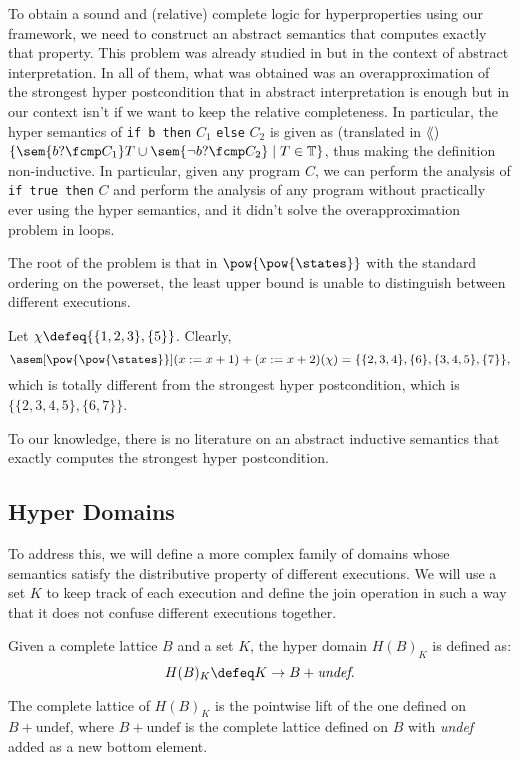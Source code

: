 To obtain a sound and (relative) complete logic for hyperproperties using
our framework, we need to construct an abstract semantics that computes
exactly that property. This problem was already studied in \cite{Mounir17,
Mastroeni18} but in the context of abstract interpretation. In all of them,
what was obtained was an overapproximation of the strongest hyper postcondition
that in abstract interpretation is enough but in our context isn't if we want
to keep the relative completeness. In particular,
the hyper semantics of \texttt{if b then} $C_1$ \texttt{else} $C_2$ is given
as (translated in $\lang$) $\{ \sem{b ? \fcmp C_1} T \cup 
\sem{\neg b ? \fcmp C_2} \mid T \in \mathbb{T}\}$, thus making the definition
non-inductive. In particular, given any program $C$, we can perform the analysis
of \texttt{if true then} $C$ and perform the analysis of any program without 
practically ever using the hyper semantics, and it didn't solve the 
overapproximation problem in loops.

The root of the problem is that in $\pow{\pow{\states}}$ with the standard 
ordering on the powerset, the least upper bound is unable to distinguish between
different executions.

\begin{example}
  \label{exmp:determinism}
  Let $\chi \defeq \{\{1, 2, 3\}, \{5\}\}$. Clearly,
  $$\asem[\pow{\pow{\states}}]{(x := x + 1) + (x := x + 2)}(\chi) = 
  \{\{2, 3, 4\}, \{6\}, \{3, 4, 5\}, \{7\}\},$$
  which is totally different from the strongest hyper postcondition, 
  which is $\{\{2, 3, 4, 5\}, \{6, 7\}\}$.
\end{example}

To our knowledge, there is no literature on an abstract inductive semantics that
exactly computes the strongest hyper postcondition.

\subsection{Hyper Domains}

To address this, we will define a more complex family of domains whose semantics 
satisfy the distributive property of different executions. We will use a set $K$ 
to keep track of each execution and define the join operation in such a way that 
it does not confuse different executions together.

\begin{definition}
  Given a complete lattice $B$ and a set $K$, the hyper domain $H(B)_K$ is 
  defined as:
  $$H(B)_K \defeq K \to B + \textit{undef}.$$

  The complete lattice of $H(B)_K$ is the pointwise lift of the one defined on 
  $B + \text{undef}$, where $B + \text{undef}$ is the complete lattice defined 
  on $B$ with \textit{undef} added as a new bottom element.
\end{definition}

